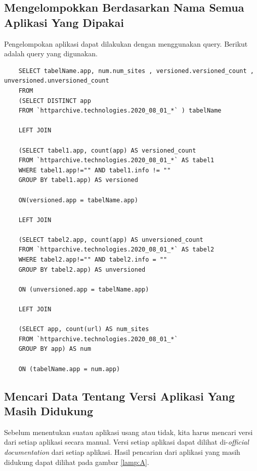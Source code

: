 \subsection{Mengelompokkan Berdasarkan Nama Semua Aplikasi Yang Dipakai}
Pengelompokan aplikasi dapat dilakukan dengan menggunakan query. Berikut adalah query yang digunakan.
\begin{lstlisting}
	SELECT tabelName.app, num.num_sites , versioned.versioned_count , unversioned.unversioned_count
	FROM 
	(SELECT DISTINCT app
	FROM `httparchive.technologies.2020_08_01_*` ) tabelName
	
	LEFT JOIN 
	
	(SELECT tabel1.app, count(app) AS versioned_count
	FROM `httparchive.technologies.2020_08_01_*` AS tabel1
	WHERE tabel1.app!="" AND tabel1.info != "" 
	GROUP BY tabel1.app) AS versioned
	
	ON(versioned.app = tabelName.app)
	
	LEFT JOIN
	
	(SELECT tabel2.app, count(app) AS unversioned_count
	FROM `httparchive.technologies.2020_08_01_*` AS tabel2
	WHERE tabel2.app!="" AND tabel2.info = "" 
	GROUP BY tabel2.app) AS unversioned
	
	ON (unversioned.app = tabelName.app)
	
	LEFT JOIN 
	
	(SELECT app, count(url) AS num_sites
	FROM `httparchive.technologies.2020_08_01_*`
	GROUP BY app) AS num
	
	ON (tabelName.app = num.app)
\end{lstlisting}

\subsection{Mencari Data Tentang Versi Aplikasi Yang Masih Didukung}
Sebelum menentukan suatau aplikasi usang atau tidak, kita harus mencari versi dari setiap aplikasi secara manual. Versi setiap aplikasi dapat dilihat di-\textit{official documentation} dari setiap aplikasi. Hasil pencarian dari aplikasi yang masih didukung dapat dilihat pada gambar \ref{lamp:A}. 

